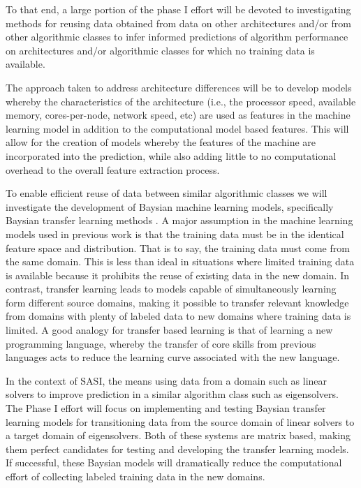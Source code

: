 To that end, a large portion of the phase I effort will be devoted to investigating methods for reusing data obtained from data on other architectures and/or from other algorithmic classes to infer informed predictions of algorithm performance on architectures and/or algorithmic classes for which no training data is available. 

The approach taken to address architecture differences will be to develop models whereby the characteristics of the architecture (i.e., the processor speed, available memory, cores-per-node, network speed, etc) are used as features in the machine learning model in addition to the computational model based features. This will allow for the creation of models whereby the features of the machine are incorporated into the prediction, while also adding little to no computational overhead to the overall feature extraction process. 

To enable efficient reuse of data between similar algorithmic classes we will investigate the development of Baysian machine learning models, specifically Baysian transfer learning methods . A major assumption in the machine learning models used in previous work is that the training data must be in the identical feature space and distribution. That is to say, the training data must come from the same domain. This is less than ideal in situations where limited training data is available because it prohibits the reuse of existing data in the new domain. In contrast, transfer learning leads to models capable of simultaneously learning form different source domains, making it possible to transfer relevant knowledge from domains with plenty of labeled data to 
new domains where training data is limited. A good analogy for transfer based learning is that of learning a new programming language, whereby the transfer of core skills from previous languages acts to reduce the learning curve associated with the new language.

In the context of SASI, the means using data from a domain such as linear solvers to improve prediction in a similar algorithm class such as eigensolvers. The Phase I effort will focus on implementing and testing Baysian transfer learning models for transitioning data from the source domain of linear solvers to a target domain of eigensolvers. Both of these systems are matrix based, making them perfect candidates for testing and developing the transfer learning models. If successful, these Baysian models will dramatically reduce the computational effort of collecting labeled training data in the new domains. 
 
